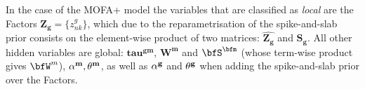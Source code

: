 In the case of the MOFA+ model the variables that are classified as \textit{local} are the Factors $\mathbf{Z_g} = \{ z_{nk}^g \}$, which due to the reparametrisation of the spike-and-slab prior consists on the element-wise product of two matrices: $\hat{\mathbf{Z_g}}$ and $\mathbf{S_g}$. All other hidden variables are global: $\mathbf{tau^{gm}}$, $\mathbf{W^m}$ and $\bfS^\bfm$ (whose term-wise product gives $\bfW^m$), $\bf\alpha^m, \bf\theta^m$, as well as $\bf\alpha^g$ and $\bf\theta^g$ when adding the spike-and-slab prior over the Factors.






